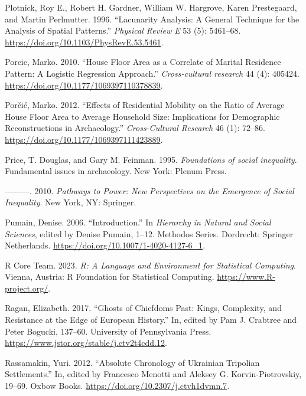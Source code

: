 \documentclass[
  12pt,
  a4paper, twoside]{book}
\newlength{\cslhangindent}
\newlength{\cslentryspacingunit} %
\newenvironment{CSLReferences}[2] %
 {%
  \setlength{\parindent}{0pt}
  \ifodd #1
  \let\oldpar\par
  \def\par{\hangindent=\cslhangindent\oldpar}
  \fi
  \setlength{\parskip}{#2\cslentryspacingunit}
 }%
 {}
\begin{document}
\begin{CSLReferences}{1}{0}
\leavevmode{}%
Plotnick, Roy E., Robert H. Gardner, William W. Hargrove, Karen Prestegaard, and Martin Perlmutter. 1996. {``Lacunarity Analysis: A General Technique for the Analysis of Spatial Patterns.''} \emph{Physical Review E} 53 (5): 5461--68. \url{https://doi.org/10.1103/PhysRevE.53.5461}.

\leavevmode{}%
Porcic, Marko. 2010. {``House Floor Area as a Correlate of Marital Residence Pattern: A Logistic Regression Approach.''} \emph{Cross-cultural research} 44 (4): 405424. \url{https://doi.org/10.1177/1069397110378839}.

\leavevmode{}%
Porčić, Marko. 2012. {``Effects of Residential Mobility on the Ratio of Average House Floor Area to Average Household Size: Implications for Demographic Reconstructions in Archaeology.''} \emph{Cross-Cultural Research} 46 (1): 72--86. \url{https://doi.org/10.1177/1069397111423889}.

\leavevmode{}%
Price, T. Douglas, and Gary M. Feinman. 1995. \emph{Foundations of social inequality}. Fundamental issues in archaeology. New York: Plenum Press.

\leavevmode{}%
---------. 2010. \emph{Pathways to Power: New Perspectives on the Emergence of Social Inequality}. New York, NY: Springer.

\leavevmode{}%
Pumain, Denise. 2006. {``Introduction.''} In \emph{Hierarchy in {Natural} and {Social Sciences}}, edited by Denise Pumain, 1--12. Methodos {Series}. {Dordrecht}: {Springer Netherlands}. \url{https://doi.org/10.1007/1-4020-4127-6_1}.

\leavevmode{}%
R Core Team. 2023. \emph{R: A Language and Environment for Statistical Computing}. Vienna, Austria: R Foundation for Statistical Computing. \url{https://www.R-project.org/}.

\leavevmode{}%
Ragan, Elizabeth. 2017. {``Ghosts of Chiefdoms Past: Kings, Complexity, and Resistance at the Edge of European History.''} In, edited by Pam J. Crabtree and Peter Bogucki, 137--60. University of Pennsylvania Press. \url{https://www.jstor.org/stable/j.ctv2t4cdd.12}.

\leavevmode{}%
Rassamakin, Yuri. 2012. {``Absolute Chronology of Ukrainian Tripolian Settlements.''} In, edited by Francesco Menotti and Aleksey G. Korvin-Piotrovskiy, 19--69. Oxbow Books. \url{https://doi.org/10.2307/j.ctvh1dvmn.7}.


\end{CSLReferences}
\end{document}

